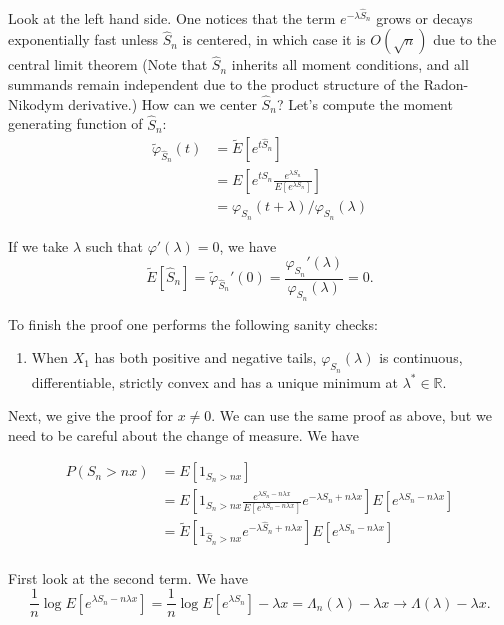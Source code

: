 Look at the left hand side. One notices that the term $e^{-\lambda \hat S_n}$ grows or decays exponentially fast unless $\hat S_n$ is centered, in which case it is $O(\sqrt{n})$ due to the central limit theorem (Note that $\hat S_n$ inherits all moment conditions, and all summands remain independent due to the product structure of the Radon-Nikodym derivative.) How can we center $\hat S_n$? Let's compute the moment generating function of $\hat S_n$:
\begin{align*}
    \tilde \varphi_{\hat S_n}(t) &= \tilde E \left[ e^{t \hat S_n} \right] \\
    &= E \left[ e^{t S_n} \frac{e^{\lambda S_n}}{E \left[ e^{\lambda S_n} \right]} \right] \\
    &= \varphi_{S_n}(t + \lambda) / \varphi_{S_n}(\lambda)
\end{align*}

If we take $\lambda$ such that $\varphi'(\lambda) = 0$, we have
\[
    \tilde E[\hat S_n] = \tilde \varphi_{\hat S_n}'(0) = \frac{\varphi_{S_n}'(\lambda)}{\varphi_{S_n}(\lambda)} = 0.
\]

To finish the proof one performs the following sanity checks:
\begin{enumerate}
    \item When $X_1$ has both positive and negative tails, $\varphi_{S_n}(\lambda)$ is continuous, differentiable, strictly convex and has a unique minimum at $\lambda^* \in \mathbb{R}$. 
\end{enumerate}

Next, we give the proof for $x \neq 0$. We can use the same proof as above, but we need to be careful about the change of measure. We have

\begin{align*}
    P\left( S_n > n x \right)
    &= E\left[ 1_{S_n > n x} \right] \\
    &= E\left[ 1_{S_n > n x} \frac{e^{\lambda S_n - n \lambda x}}{ E \left[ e^{\lambda S_n - n \lambda x} \right]} e^{-\lambda S_n + n \lambda x} \right] E \left[ e^{\lambda S_n - n \lambda x} \right] \\
    &= \tilde E \left[ 1_{\hat S_n > n x} e^{-\lambda \hat S_n + n \lambda x} \right] E \left[ e^{\lambda S_n - n \lambda x} \right] \\
\end{align*}

First look at the second term. We have
\[
    \frac{1}{n} \log E \left[ e^{\lambda S_n - n \lambda x} \right] = \frac{1}{n} \log E \left[ e^{\lambda S_n} \right] - \lambda x = \Lambda_n(\lambda) - \lambda x
    \to \Lambda(\lambda) - \lambda x.
\]


